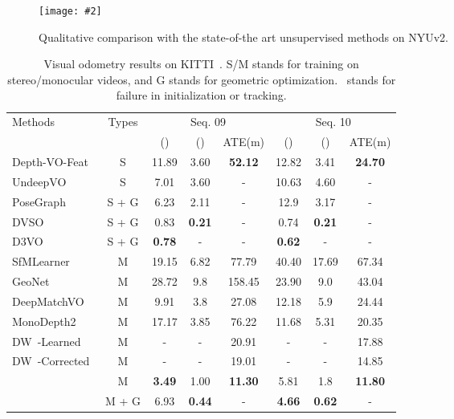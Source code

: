 \documentclass[twocolumn]{svjour3}
\renewcommand{\cite}[1]{\textcolor{blue}{\citep{#1}}}
\newcommand{\addImg}[2][0.495]{\texttt{[image: \#2]}}
\begin{document}
\begin{figure}[t]
  \centering
  \addImg[0.48]{images/nyu-vis.pdf}
  \caption{Qualitative comparison with the state-of-the art unsupervised methods on NYUv2.}
  \label{fig:nyu-vis}
\end{figure}

\begin{table*}[t]
\centering
    \setlength{\tabcolsep}{0.1mm}
    \caption{Visual odometry results on KITTI~\cite{Geiger2013IJRR}. S/M stands for training on stereo/monocular videos, and G stands for geometric optimization. \xmark ~stands for failure in initialization or tracking.
    }
    \label{tab:vo}
    \begin{tabular}{l c | c c c | c c c}
     \hline
     \multirow{2}{*}{Methods} & \multirow{2}{*}{Types} & \multicolumn{3}{c|}{Seq. 09} & \multicolumn{3}{c}{Seq. 10} \\
     & &  () &  () & ATE(m) &  () &  () & ATE(m) \\
\hline
    Depth-VO-Feat~\cite{zhan2018unsupervised} & S & 11.89 & 3.60 & \textbf{52.12} & 12.82 & 3.41 & \textbf{24.70} \\
    UndeepVO~\cite{li2018undeepvo} & S & 7.01 & 3.60 & - & 10.63 & 4.60 & - \\
    PoseGraph~\cite{li2019pose} & S + G & 6.23 & 2.11  & - & 12.9 & 3.17 & - \\ 
    DVSO~\cite{yang2018unsupervised} & S + G & 0.83 & \textbf{0.21} & - & 0.74 & \textbf{0.21} & - \\
    D3VO~\cite{yang2020d3vo} & S + G & \textbf{0.78} & - & - & \textbf{0.62} & - & - \\
    \hline
    SfMLearner~\cite{zhou2017unsupervised} & M & 19.15 & 6.82 & 77.79 & 40.40 & 17.69 & 67.34 \\ 
    GeoNet~\cite{yin2018geonet} & M &  28.72 & 9.8 & 158.45 & 23.90 & 9.0 & 43.04 \\
    DeepMatchVO~\cite{shen2019beyond} & M & 9.91 & 3.8 & 27.08 & 12.18 & 5.9 & 24.44 \\
    MonoDepth2~\cite{monodepth2} & M & 17.17 & 3.85 & 76.22 & 11.68 & 5.31 & 20.35 \\
    DW~\cite{gordon2019depth}-Learned & M & - & - & 20.91 & - & - & 17.88 \\
    DW~\cite{gordon2019depth}-Corrected & M & - & - & 19.01 & - & - & 14.85 \\
    \cite{zou2020learning} & M & \textbf{3.49} & 1.00 & \textbf{11.30} & 5.81 & 1.8 & \textbf{11.80} \\
    \cite{zhao2020towards} & M + G & 6.93 & \textbf{0.44} & - & \textbf{4.66} & \textbf{0.62} & - \\

\end{tabular}
\end{table*}
\end{document}
